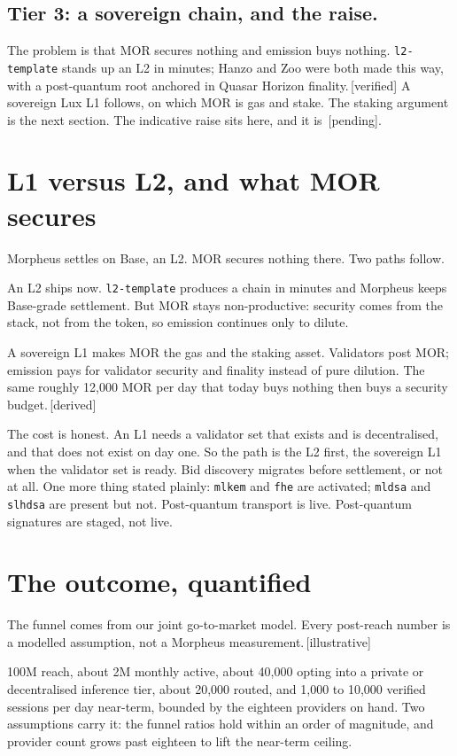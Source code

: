 \documentclass[11pt,a4paper]{article}
\newcommand{\code}[1]{\texttt{\small #1}}
\newcommand{\lab}[1]{{\color{muted}\footnotesize\,[#1]}}
\begin{document}
\subsection*{Tier 3: a sovereign chain, and the raise.}

The problem is that MOR secures nothing and emission buys nothing.
\code{l2-template} stands up an L2 in minutes; Hanzo and Zoo were both made this
way, with a post-quantum root anchored in Quasar Horizon finality.\lab{verified}
A sovereign Lux L1 follows, on which MOR is gas and stake. The staking argument
is the next section. The indicative raise sits here, and it is \lab{pending}.

\section*{L1 versus L2, and what MOR secures}

Morpheus settles on Base, an L2. MOR secures nothing there. Two paths follow.

An L2 ships now. \code{l2-template} produces a chain in minutes and Morpheus
keeps Base-grade settlement. But MOR stays non-productive: security comes from
the stack, not from the token, so emission continues only to dilute.

A sovereign L1 makes MOR the gas and the staking asset. Validators post MOR;
emission pays for validator security and finality instead of pure dilution. The
same roughly 12{,}000 MOR per day that today buys nothing then buys a security
budget.\lab{derived}

The cost is honest. An L1 needs a validator set that exists and is decentralised,
and that does not exist on day one. So the path is the L2 first, the sovereign L1
when the validator set is ready. Bid discovery migrates before settlement, or not
at all. One more thing stated plainly: \code{mlkem} and \code{fhe} are activated;
\code{mldsa} and \code{slhdsa} are present but not. Post-quantum transport is
live. Post-quantum signatures are staged, not live.

\section*{The outcome, quantified}

The funnel comes from our joint go-to-market model. Every post-reach number is a
modelled assumption, not a Morpheus measurement.\lab{illustrative}

100M reach, about 2M monthly active, about 40{,}000 opting into a private or
decentralised inference tier, about 20{,}000 routed, and 1{,}000 to 10{,}000
verified sessions per day near-term, bounded by the eighteen providers on hand.
Two assumptions carry it: the funnel ratios hold within an order of magnitude,
and provider count grows past eighteen to lift the near-term ceiling.
\end{document}
